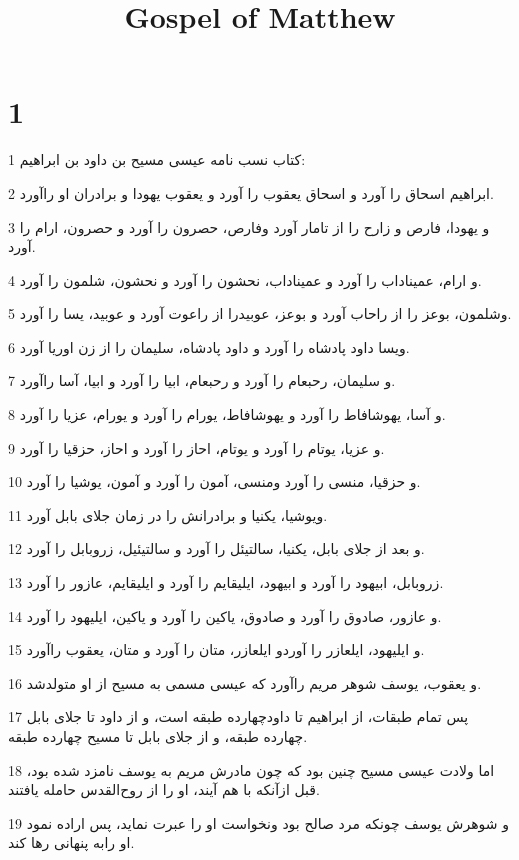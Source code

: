 

\title{Gospel of Matthew}


\chapter{1}

\par 1 کتاب نسب نامه عیسی مسیح بن داود بن ابراهیم:
\par 2 ابراهیم اسحاق را آورد و اسحاق یعقوب را آورد و یعقوب یهودا و برادران او راآورد.
\par 3 و یهودا، فارص و زارح را از تامار آورد وفارص، حصرون را آورد و حصرون، ارام را آورد.
\par 4 و ارام، عمیناداب را آورد و عمیناداب، نحشون را آورد و نحشون، شلمون را آورد.
\par 5 وشلمون، بوعز را از راحاب آورد و بوعز، عوبیدرا از راعوت آورد و عوبید، یسا را آورد.
\par 6 ویسا داود پادشاه را آورد و داود پادشاه، سلیمان را از زن اوریا آورد.
\par 7 و سلیمان، رحبعام را آورد و رحبعام، ابیا را آورد و ابیا، آسا راآورد.
\par 8 و آسا، یهوشافاط را آورد و یهوشافاط، یورام را آورد و یورام، عزیا را آورد.
\par 9 و عزیا، یوتام را آورد و یوتام، احاز را آورد و احاز، حزقیا را آورد.
\par 10 و حزقیا، منسی را آورد ومنسی، آمون را آورد و آمون، یوشیا را آورد.
\par 11 ویوشیا، یکنیا و برادرانش را در زمان جلای بابل آورد.
\par 12 و بعد از جلای بابل، یکنیا، سالتیئل را آورد و سالتیئیل، زروبابل را آورد.
\par 13 زروبابل، ابیهود را آورد و ابیهود، ایلیقایم را آورد و ایلیقایم، عازور را آورد.
\par 14 و عازور، صادوق را آورد و صادوق، یاکین را آورد و یاکین، ایلیهود را آورد.
\par 15 و ایلیهود، ایلعازر را آوردو ایلعازر، متان را آورد و متان، یعقوب راآورد.
\par 16 و یعقوب، یوسف شوهر مریم راآورد که عیسی مسمی به مسیح از او متولدشد.
\par 17 پس تمام طبقات، از ابراهیم تا داودچهارده طبقه است، و از داود تا جلای بابل چهارده طبقه، و از جلای بابل تا مسیح چهارده طبقه.
\par 18 اما ولادت عیسی مسیح چنین بود که چون مادرش مریم به یوسف نامزد شده بود، قبل ازآنکه با هم آیند، او را از روح‌القدس حامله یافتند.
\par 19 و شوهرش یوسف چونکه مرد صالح بود ونخواست او را عبرت نماید، پس اراده نمود او رابه پنهانی رها کند.
